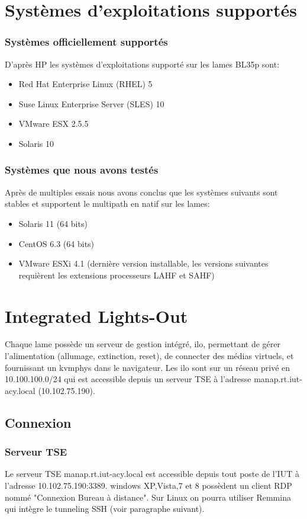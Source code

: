 \documentclass[a4paper,oneside]{report}
\begin{document}
\section{Systèmes d'exploitations supportés}
\subsubsection{Systèmes officiellement supportés}
D'après HP les systèmes d'exploitations supporté sur les lames BL35p sont:
\begin{itemize}
\item Red Hat Enterprise Linux (RHEL) 5
\item Suse Linux Enterprise Server (SLES) 10
\item VMware ESX 2.5.5
\item Solaris 10
\end{itemize}

\subsubsection{Systèmes que nous avons testés}
Après de multiples essais nous avons conclus que les systèmes suivants sont stables et supportent le multipath en natif sur les lames:
\begin{itemize}
\item Solaris 11 (64 bits)
\item CentOS 6.3 (64 bits)
\item VMware ESXi 4.1 (dernière version installable, les versions suivantes requièrent les extensions processeurs LAHF et SAHF)
\end{itemize}

\section{Integrated Lights-Out}
Chaque lame possède un serveur de gestion intégré, \gls{ilo}, permettant de gérer l'alimentation (allumage, extinction, reset), de connecter des médias virtuels, et fournissant un \gls{kvmphys} dans le navigateur.
Les \gls{ilo} sont sur un réseau privé en 10.100.100.0/24 qui est accessible depuis un serveur TSE à l'adresse manap.rt.iut-acy.local (10.102.75.190).

\subsection{Connexion}
\subsubsection{Serveur TSE}
Le serveur TSE manap.rt.iut-acy.local est accessible depuis tout poste de l'IUT à l'adresse 10.102.75.190:3389. \gls{windows} XP,Vista,7 et 8 possèdent un client RDP nommé "Connexion Bureau à distance". Sur Linux on pourra utiliser Remmina qui intègre le tunneling SSH (voir paragraphe suivant).
\end{document}

